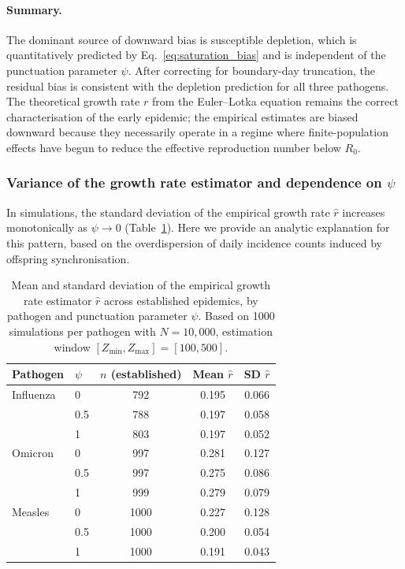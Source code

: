 \paragraph{Summary.} The dominant source of downward bias is susceptible depletion, which is quantitatively predicted by Eq.~\eqref{eq:saturation_bias} and is independent of the punctuation parameter $\psi$. After correcting for boundary-day truncation, the residual bias is consistent with the depletion prediction for all three pathogens. The theoretical growth rate $r$ from the Euler--Lotka equation remains the correct characterisation of the early epidemic; the empirical estimates are biased downward because they necessarily operate in a regime where finite-population effects have begun to reduce the effective reproduction number below $R_0$.

\clearpage

\subsubsection*{Variance of the growth rate estimator and dependence on $\psi$}

In simulations, the standard deviation of the empirical growth rate $\hat{r}$ increases monotonically as $\psi \to 0$ (Table~\ref{tab:growthrate_sd}). Here we provide an analytic explanation for this pattern, based on the overdispersion of daily incidence counts induced by offspring synchronisation.

\begin{table}[h]
\centering
\begin{tabular}{llccc}
	\hline\hline
	Pathogen & $\psi$ & $n$ (established) & Mean $\hat{r}$ & SD $\hat{r}$ \\
	\hline
	Influenza & 0   & 792  & 0.195 & 0.066 \\
	          & 0.5 & 788  & 0.197 & 0.058 \\
	          & 1   & 803  & 0.197 & 0.052 \\[4pt]
	Omicron   & 0   & 997  & 0.281 & 0.127 \\
	          & 0.5 & 997  & 0.275 & 0.086 \\
	          & 1   & 999  & 0.279 & 0.079 \\[4pt]
	Measles   & 0   & 1000 & 0.227 & 0.128 \\
	          & 0.5 & 1000 & 0.200 & 0.054 \\
	          & 1   & 1000 & 0.191 & 0.043 \\
	\hline\hline
\end{tabular}
\caption{Mean and standard deviation of the empirical growth rate estimator $\hat{r}$ across established epidemics, by pathogen and punctuation parameter $\psi$. Based on 1000 simulations per pathogen with $N = 10{,}000$, estimation window $[Z_{\min}, Z_{\max}] = [100, 500]$.}
\label{tab:growthrate_sd}
\end{table}

